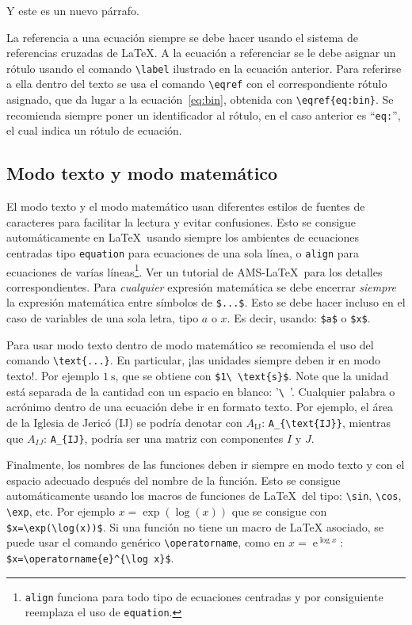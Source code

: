 \documentclass{article}
\begin{document}
Y este es un nuevo párrafo. 

La referencia a una ecuación siempre se debe hacer usando el sistema de referencias cruzadas de \LaTeX{}. A la ecuación a referenciar se le debe asignar un rótulo usando el comando \verb|\label| ilustrado en la ecuación anterior. Para referirse a ella dentro del texto se usa el comando \verb|\eqref| con el correspondiente rótulo asignado, que da lugar a la ecuación~\eqref{eq:bin}, obtenida con \verb|\eqref{eq:bin}|. Se recomienda siempre poner un identificador al rótulo, en el caso anterior es ``\verb|eq:|'', el cual indica un rótulo de ecuación.

\subsection{Modo texto y modo matemático}

El modo texto y el modo matemático usan diferentes estilos de fuentes de caracteres para facilitar la lectura y evitar confusiones. Esto se consigue automáticamente en \LaTeX\ usando siempre los ambientes de ecuaciones centradas tipo \verb|equation| para ecuaciones de una sola línea, o \verb|align| para ecuaciones de varías 
líneas\footnote{\texttt{align} funciona para todo tipo de ecuaciones centradas y por consiguiente reemplaza el uso de \texttt{equation}. }.
Ver un tutorial de AMS-\LaTeX\ para los detalles correspondientes. Para \emph{cualquier} expresión matemática se debe encerrar  \emph{siempre} la expresión matemática entre símbolos de \verb|$...$|.
Esto se debe hacer incluso en el caso de variables de una sola letra, tipo $a$ o $x$. Es decir, usando: \verb|$a$| o \verb|$x$|.

Para usar modo texto dentro de modo matemático se recomienda el uso del comando \verb|\text{...}|. En particular, ¡las unidades siempre deben ir en modo texto!. Por ejemplo $1\ \text{s}$, que se obtiene con \verb|$1\ \text{s}$|. Note que la unidad está separada de la cantidad con un espacio en blanco: '\verb|\ |'. Cualquier palabra o acrónimo dentro de una ecuación debe ir en formato texto. Por ejemplo, el área de la Iglesia de Jericó (IJ) se podría denotar con $A_{\text{IJ}}$: \verb|A_{\text{IJ}}|, mientras que $A_{IJ}$: \verb|A_{IJ}|, podría ser una matriz con componentes $I$ y $J$.

Finalmente, los nombres de las funciones deben ir siempre en modo texto y con el espacio adecuado después del nombre de la función. Esto se consigue automáticamente usando los macros de funciones de \LaTeX\ del tipo: \verb|\sin|, \verb|\cos|, \verb|\exp|, etc. Por ejemplo $x=\exp(\log(x))$  que se consigue con \verb|$x=\exp(\log(x))$|. Si una función no tiene un macro de \LaTeX{} asociado, se puede usar el comando genérico \verb|\operatorname|, como en  $x=\operatorname{e}^{\log x}$: \verb|$x=\operatorname{e}^{\log x}$|.
\end{document}
